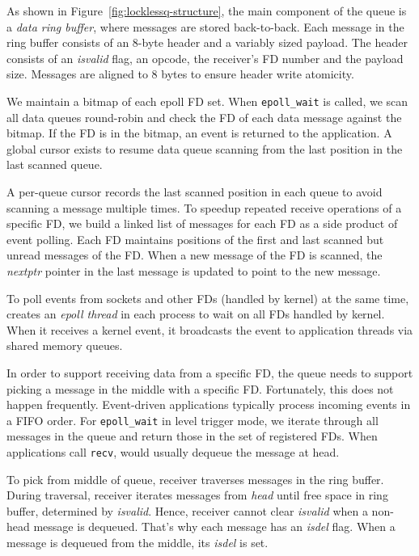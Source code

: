 As shown in Figure~\ref{fig:locklessq-structure}, the main component of the queue is a \emph{data ring buffer}, where messages are stored back-to-back.
Each message in the ring buffer consists of an 8-byte header and a variably sized payload. The header consists of an \textit{isvalid} flag, an opcode, the receiver's FD number and the payload size. Messages are aligned to 8 bytes to ensure header write atomicity.%

We maintain a bitmap of each epoll FD set.
When \texttt{epoll\_wait} is called, we scan all data queues round-robin and check the FD of each data message against the bitmap. If the FD is in the bitmap, an event is returned to the application.
A global cursor exists to resume data queue scanning from the last position in the last scanned queue.

A per-queue cursor records the last scanned position in each queue to avoid scanning a message multiple times.
To speedup repeated receive operations of a specific FD, we build a linked list of messages for each FD as a side product of event polling.
Each FD maintains positions of the first and last scanned but unread messages of the FD.
When a new message of the FD is scanned, the \emph{nextptr} pointer in the last message is updated to point to the new message.

To poll events from sockets and other FDs (handled by kernel) at the same time, \libipc{} creates an \textit{epoll thread} in each process to wait on all FDs handled by kernel. When it receives a kernel event, it broadcasts the event to application threads via shared memory queues. %

In order to support receiving data from a specific FD, the queue needs to support picking a message in the middle with a specific FD.
Fortunately, this does not happen frequently. Event-driven applications typically process incoming events in a FIFO order. For \texttt{epoll\_wait} in level trigger mode, we iterate through all messages in the queue and return those in the set of registered FDs. When applications call \texttt{recv}, \libipc{} would usually dequeue the message at head.

To pick from middle of queue, receiver traverses messages in the ring buffer. During traversal, receiver iterates messages from \textit{head} until free space in ring buffer, determined by \textit{isvalid}. Hence, receiver cannot clear \textit{isvalid} when a non-head message is dequeued. That's why each message has an \textit{isdel} flag. When a message is dequeued from the middle, its \textit{isdel} is set. %

